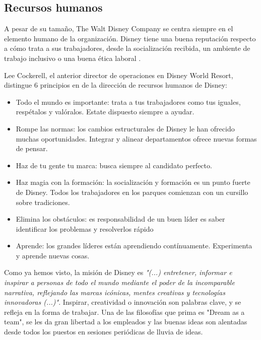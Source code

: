 \subsection{Recursos humanos}
A pesar de su tamaño, The Walt Disney Company se centra siempre en el elemento humano de la organización. Disney tiene una buena reputación respecto a cómo trata a sus trabajadores, desde la socialización recibida, un ambiente de trabajo inclusivo  o una buena ética laboral .

Lee Cockerell, el anterior director de operaciones en Disney World Resort, distingue 6 principios en de la dirección de recursos humanos de Disney:
\begin{itemize}
\item Todo el mundo es importante: trata a tus trabajadores como tus iguales, respétalos y valóralos. Estate dispuesto siempre a ayudar.

\item Rompe las normas: los cambios estructurales de Disney le han ofrecido muchas oportunidades. Integrar y alinear departamentos ofrece nuevas formas de pensar.

\item Haz de tu gente tu marca: busca siempre al candidato perfecto.

\item Haz magia con la formación: la socialización y formación es un punto fuerte de Disney. Todos los trabajadores en los parques comienzan con un cursillo sobre tradiciones.

\item Elimina los obstáculos: es responsabilidad de un buen líder es saber identificar los problemas y resolverlos rápido

\item Aprende: los grandes líderes están aprendiendo contínuamente. Experimenta y aprende nuevas cosas.

\end{itemize}

Como ya hemos visto, la misión de Disney es \textit{"(...) entretener, informar e inspirar a personas de todo el mundo mediante el poder de la incomparable narrativa, reflejando las marcas icónicas, mentes creativas y tecnologías innovadoras (...)"}. Inspirar, creatividad o innovación son palabras clave, y se refleja en la forma de trabajar. Una de las filosofías que prima es "Dream as a team", se les da gran libertad a los empleados y las buenas ideas son alentadas desde todos los puestos en sesiones periódicas de lluvia de ideas.
